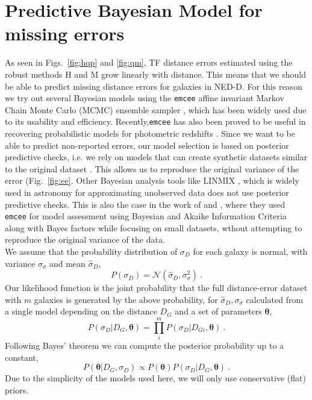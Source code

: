 \documentclass[a4paper,fleqn,usenatbib]{mnras}
\begin{document}
\section{Predictive Bayesian Model for missing errors}
\label{sec:predbay} %

As seen in Figs.~\ref{fig:hqp} and \ref{fig:qm}, TF distance errors estimated using the robust methods H and M grow linearly with distance. This means that we should be able to predict missing distance errors for galaxies in NED-D. For this reason we try out several Bayesian models using the \texttt{emcee} affine invariant Markov Chain Monte Carlo (MCMC) ensemble sampler \citep{emcee}, which has been widely used due to its usability and efficiency. Recently,\texttt{emcee} has also been proved to be useful in recovering probabilistic models for photometric redshifts \citet{photred1,photred2}. Since we want to be able to predict non-reported errors, our model selection is based on posterior predictive checks, i.e. we rely on models that can create synthetic datasets similar to the original dataset \citep{gelmanppd}. This allows us to reproduce the original variance of the error (Fig.~\ref{fig:ee}. Other Bayesian analysis tools like LINMIX  \citep{gmastro}, which is widely used in astronomy for approximating unobserved data does not use posterior predictive checks. This is also the case in the work of \citet{propprob2018} and \citet{bayesh}, where they used \texttt{emcee} for model assessment using Bayesian and Akaike Information Criteria along with Bayes factors while focusing on small datasets, wthout attempting to reproduce the original variance of the data. \\

We assume that the probability distribution of $\sigma_D$ for each galaxy is normal, with variance $\sigma_\sigma$ and mean $\hat{\sigma}_{D}$, 
\[P(\sigma_D)=\mathcal{N}(\hat{\sigma}_D,\sigma_\sigma^2)\ .\]
Our likelihood function is the joint probability that the full distance-error dataset with $m$ galaxies is generated by the above probability, for $\hat{\sigma}_D,\sigma_\sigma$ calculated from a single model depending on the distance $D_G$ and a set of parameters $\pmb{\theta}$,
\[P(\sigma_D|D_G,\pmb{\theta})=\prod_i^mP(\sigma_D|D_{Gi},\pmb{\theta})\ .\]
Following Bayes' theorem we can compute the posterior probability up to a constant,
\[P(\pmb{\theta}|D_G,\sigma_D)\propto P(\pmb{\theta})P(\sigma_D|D_G,\pmb{\theta})\ .\]
Due to the simplicity of the models used here, we will only use conservative (flat) priors.\\
\end{document}
